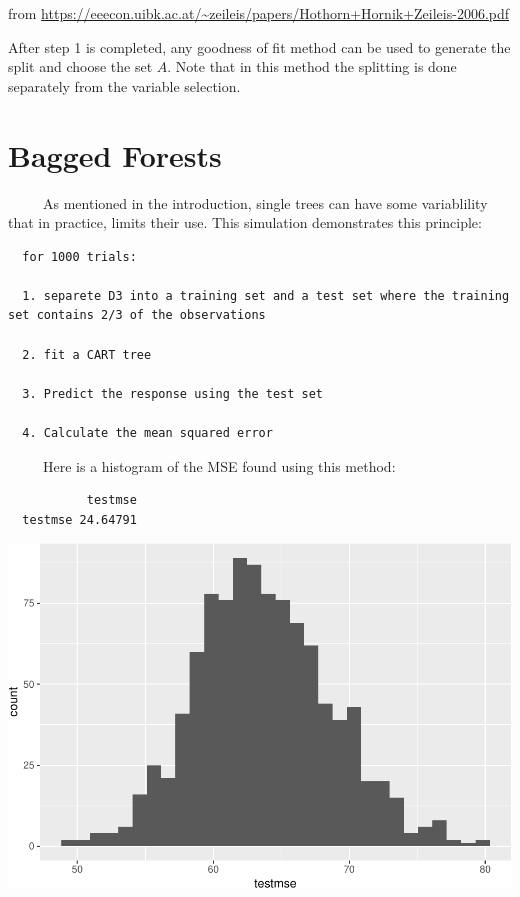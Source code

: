 \documentclass[12pt,twoside]{reedthesis}
\begin{document}
  from
  \url{https://eeecon.uibk.ac.at/~zeileis/papers/Hothorn+Hornik+Zeileis-2006.pdf}
  
  After step 1 is completed, any goodness of fit method can be used to
  generate the split and choose the set \(A\). Note that in this method
  the splitting is done separately from the variable selection.
  
  \section{Bagged Forests}\label{bagged-forests}
  
  ~~~~~As mentioned in the introduction, single trees can have some
  variablility that in practice, limits their use. This simulation
  demonstrates this principle:
  
  \begin{verbatim}
  for 1000 trials:
  
  1. separete D3 into a training set and a test set where the training set contains 2/3 of the observations
  
  2. fit a CART tree
  
  3. Predict the response using the test set 
  
  4. Calculate the mean squared error 
  \end{verbatim}
  
  ~~~~~Here is a histogram of the MSE found using this method:
  
  \begin{verbatim}
           testmse
  testmse 24.64791
  \end{verbatim}
  
  \begin{center}\includegraphics{Thesis_files/figure-latex/unnamed-chunk-11-1} \end{center}
  
\end{document}

